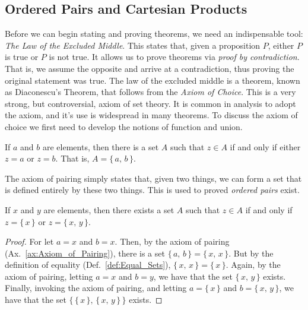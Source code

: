     \subsection{Ordered Pairs and Cartesian Products}
        Before we can begin stating and proving theorems, we need an
        indispensable tool: \textit{The Law of the Excluded Middle}. This
        states that, given a proposition $P$, either $P$ is true or $P$ is
        not true. It allows us to prove theorems via
        \textit{proof by contradiction}. That is, we assume the opposite and
        arrive at a contradiction, thus proving the original statement was
        true. The law of the excluded middle is a theorem, known as
        Diaconescu's Theorem, that follows from the \textit{Axiom of Choice}.
        This is a very strong, but controversial, axiom of set theory. It is
        common in analysis to adopt the axiom, and it's use is widespread in
        many theorems. To discuss the axiom of choice we first need to
        develop the notions of function and union.
        \begin{axiom}
            \label{ax:Axiom_of_Pairing}%
            If $a$ and $b$ are elements, then there is a set $A$ such that
            $z\in{A}$ if and only if either $z=a$ or $z=b$. That is,
            $A=\{\,a,\,b\,\}$.
        \end{axiom}
        The axiom of pairing simply states that, given two things, we can
        form a set that is defined entirely by these two things. This is
        used to proved \textit{ordered pairs} exist.
        \begin{theorem}
            \label{thm:Existence_of_Ordered_Pair}%
            If $x$ and $y$ are elements, then there exists a set $A$ such
            that $z\in{A}$ if and only if $z=\{\,x\,\}$ or $z=\{\,x,\,y\,\}$.
        \end{theorem}
        \begin{proof}
            For let $a=x$ and $b=x$. Then, by the axiom of pairing
            (Ax.~\ref{ax:Axiom_of_Pairing}), there is a set
            $\{\,a,\,b\,\}=\{\,x,\,x\,\}$. But by the definition of equality
            (Def.~\ref{def:Equal_Sets}), $\{\,x,\,x\,\}=\{\,x\,\}$. Again, by
            the axiom of pairing, letting $a=x$ and $b=y$, we have that the
            set $\{\,x,\,y\,\}$ exists. Finally, invoking the axiom of
            pairing, and letting $a=\{\,x\,\}$ and $b=\{\,x,\,y\,\}$, we have
            that the set $\{\,\{\,x\,\},\,\{\,x,\,y\,\}\,\}$ exists.
        \end{proof}
